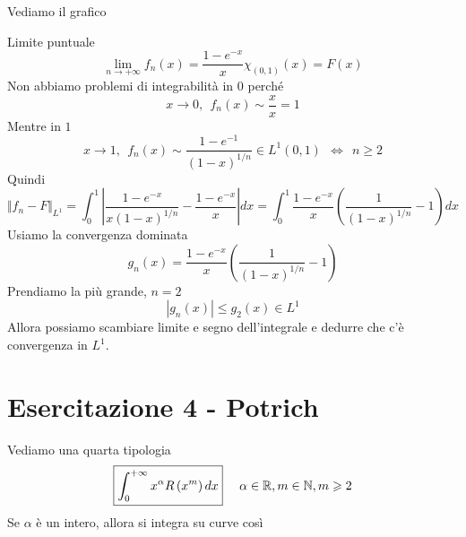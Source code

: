 Vediamo il grafico


Limite puntuale
\begin{equation*}
\lim\limits _{n\rightarrow + \infty } f_{n}(x) = \frac{1 - e^{ - x}}{x} \chi _{(0,1)} (x) = F(x)
\end{equation*}
Non abbiamo problemi di integrabilità in $0$ perché
\begin{equation*}
x\rightarrow 0,\ \ f_{n}(x) \sim \frac{x}{x} = 1
\end{equation*}
Mentre in $1$
\begin{equation*}
x\rightarrow 1,\ \ f_{n}(x) \sim \frac{1 - e^{ - 1}}{(1 - x)^{1/n}} \in L^{1}(0,1) \ \ \iff \ \ n\geqslant 2
\end{equation*}
Quindi
\begin{equation*}
\Vert f_{n} - F\Vert _{L^{1}} = \int ^{1}_{0}\left| \frac{1 - e^{ - x}}{x(1 - x)^{1/n}} - \frac{1 - e^{ - x}}{x}\right| dx = \int ^{1}_{0}\frac{1 - e^{ - x}}{x}\left(\frac{1}{(1 - x)^{1/n}} - 1\right) dx
\end{equation*}
Usiamo la convergenza dominata
\begin{equation*}
g_{n}(x) = \frac{1 - e^{ - x}}{x}\left(\frac{1}{(1 - x)^{1/n}} - 1\right)
\end{equation*}
Prendiamo la più grande, $n = 2$
\begin{equation*}
| g_{n}(x)| \leqslant g_{2}(x) \in L^{1}
\end{equation*}
Allora possiamo scambiare limite e segno dell'integrale e dedurre che c'è convergenza in $L^{1}$.
\chapter{Esercitazione 4 - Potrich}
\ParteEsercizi
\Esercizio{}

Vediamo una quarta tipologia
\begin{equation*}
\boxed{\int ^{ + \infty }_{0} x^{\alpha } R\left(x^{m}\right) dx} \ \ \ \ \alpha \in \mathbb{R}  ,m\in \mathbb{N}  ,m\geqslant 2
\end{equation*}
Se $\alpha $ è un intero, allora si integra su curve così


